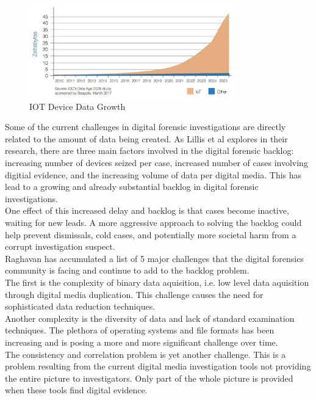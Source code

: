 \documentclass[12pt]{article}
\begin{document}
\begin{figure}[ht]
  \centering
    \includegraphics[width=0.8\textwidth]{images/IOT_chart.jpg}
  \caption{IOT Device Data Growth}
\end{figure}

Some of the current challenges in digital forensic investigations are directly related to the amount of data being
created.  As Lillis et al\cite{lillis2016current} explores in their research, there are three main factors
involved in the digital forensic backlog: increasing number of devices seized per case, increased number of cases
involving digitial evidence, and the increasing volume of data per digital media.  This has lead to a growing
and already substantial backlog in digital forensic investigations.\\

One effect of this increased delay and backlog is that cases become inactive, waiting for new leads.  A more
aggressive approach to solving the backlog could help prevent dismissals, cold cases, and potentially more
societal harm from a corrupt investigation suspect.\\

Raghavan\cite{raghavan2013digital} has accumulated a list of 5 major challenges that the digital forensics 
community is facing and continue to add to the backlog problem.\\

The first is the complexity of binary data aquisition, i.e. low level data aquisition through digital media
duplication.  This challenge causes the need for sophisticated data reduction techniques.\\

Another complexity is the diversity of data and lack of standard examination techniques.  The plethora of
operating systems and file formats has been increasing and is posing a more and more significant challenge
over time.\\

The consistency and correlation problem is yet another challenge.  This is a problem resulting from the current
digital media investigation tools not providing the entire picture to investigators.  Only part of the whole
picture is provided when these tools find digital evidence.\\
\end{document}

